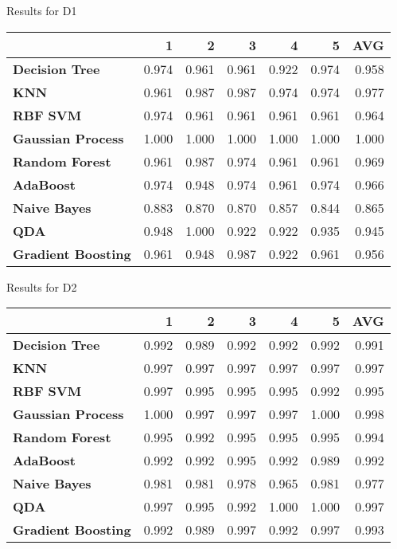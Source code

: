 Results for D1
\begin{tabular}{lrrrrrr}
\toprule
{} &      1 &      2 &      3 &      4 &      5 &    AVG \\
\midrule
\textbf{Decision Tree    } &  0.974 &  0.961 &  0.961 &  0.922 &  0.974 &  0.958 \\
\textbf{KNN              } &  0.961 &  0.987 &  0.987 &  0.974 &  0.974 &  0.977 \\
\textbf{RBF SVM          } &  0.974 &  0.961 &  0.961 &  0.961 &  0.961 &  0.964 \\
\textbf{Gaussian Process } &  1.000 &  1.000 &  1.000 &  1.000 &  1.000 &  1.000 \\
\textbf{Random Forest    } &  0.961 &  0.987 &  0.974 &  0.961 &  0.961 &  0.969 \\
\textbf{AdaBoost         } &  0.974 &  0.948 &  0.974 &  0.961 &  0.974 &  0.966 \\
\textbf{Naive Bayes      } &  0.883 &  0.870 &  0.870 &  0.857 &  0.844 &  0.865 \\
\textbf{QDA              } &  0.948 &  1.000 &  0.922 &  0.922 &  0.935 &  0.945 \\
\textbf{Gradient Boosting} &  0.961 &  0.948 &  0.987 &  0.922 &  0.961 &  0.956 \\
\bottomrule
\end{tabular}

Results for D2
\begin{tabular}{lrrrrrr}
\toprule
{} &      1 &      2 &      3 &      4 &      5 &    AVG \\
\midrule
\textbf{Decision Tree    } &  0.992 &  0.989 &  0.992 &  0.992 &  0.992 &  0.991 \\
\textbf{KNN              } &  0.997 &  0.997 &  0.997 &  0.997 &  0.997 &  0.997 \\
\textbf{RBF SVM          } &  0.997 &  0.995 &  0.995 &  0.995 &  0.992 &  0.995 \\
\textbf{Gaussian Process } &  1.000 &  0.997 &  0.997 &  0.997 &  1.000 &  0.998 \\
\textbf{Random Forest    } &  0.995 &  0.992 &  0.995 &  0.995 &  0.995 &  0.994 \\
\textbf{AdaBoost         } &  0.992 &  0.992 &  0.995 &  0.992 &  0.989 &  0.992 \\
\textbf{Naive Bayes      } &  0.981 &  0.981 &  0.978 &  0.965 &  0.981 &  0.977 \\
\textbf{QDA              } &  0.997 &  0.995 &  0.992 &  1.000 &  1.000 &  0.997 \\
\textbf{Gradient Boosting} &  0.992 &  0.989 &  0.997 &  0.992 &  0.997 &  0.993 \\
\bottomrule
\end{tabular}

